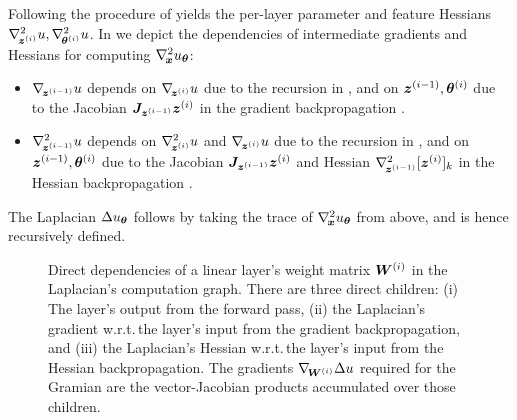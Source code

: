 Following the procedure of  yields the
per-layer parameter and feature Hessians $\nabla_{\!{{\bm{z}}^{(i)}}}^{2}u,
\nabla_{\!{{\bm{\theta}}^{(i)}}}^{2}u$. In  we depict the dependencies of
intermediate gradients and Hessians for computing $\nabla_{\!{{\bm{x}}}}^{2}u_{{\bm{\theta}}}$:
\begin{itemize}
\item $\nabla_{\!{{\bm{z}}^{(i-1)}}}u$ depends on $\nabla_{\!{{\bm{z}}^{(i)}}}u$ due to the recursion in , and on ${\bm{z}}^{(i-1)}, {\bm{\theta}}^{(i)}$ due to the Jacobian ${\bm{J}}_{{\bm{z}}^{(i-1)}}{\bm{z}}^{(i)}$ in the gradient backpropagation .

\item $\nabla_{\!{{\bm{z}}^{(i-1)}}}^{2}u$ depends on $\nabla_{\!{{\bm{z}}^{(i)}}}^{2}u$ and $\nabla_{\!{{\bm{z}}^{(i)}}} u$ due to the recursion in , and on ${\bm{z}}^{(i-1)}, {\bm{\theta}}^{(i)}$ due to the Jacobian ${\bm{J}}_{{\bm{z}}^{(i-1)}}{\bm{z}}^{(i)}$ and Hessian $\nabla_{\!{{\bm{z}}^{(i-1)}}}^{2}[{\bm{z}}^{(i)}]_k$ in the Hessian backpropagation .
\end{itemize}


The Laplacian $\Delta u_{{\bm{\theta}}}$ follows by taking the trace of
$\nabla_{\!{{\bm{x}}}}^{2}u_{{\bm{\theta}}}$ from above, and is hence recursively defined.

\begin{figure}[t]
  \centering
  \begin{minipage}[b]{0.495\linewidth}
    \centering
    \resizebox{\linewidth}{!}{%
      
    }
  \end{minipage}
  \hfill
  \begin{minipage}[b]{0.495\linewidth}
    \caption{Direct dependencies of a linear layer's weight matrix ${\bm{W}}^{(i)}$ in the Laplacian's computation graph.
      There are three direct children: (i) The layer's output from the forward pass, (ii) the Laplacian's gradient w.r.t.\,the layer's input from the gradient backpropagation, and (iii) the Laplacian's Hessian w.r.t.\,the layer's input from the Hessian backpropagation.
      The gradients $\nabla_{\!{{\bm{W}}^{(i)}}}\Delta u$ required for the Gramian are the vector-Jacobian products accumulated over those children.
    }\label{fig:laplacian-graph-weight}
  \end{minipage}
\end{figure}

